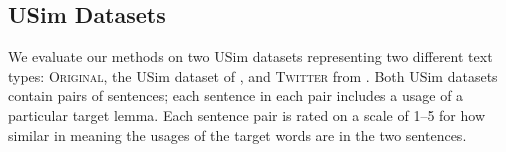 \documentclass[11pt]{article}
\newcommand\original{\textsc{Original}\xspace}
\newcommand\twitter{\textsc{Twitter}\xspace}
\begin{document}

\subsection{USim Datasets \label{sec:datasets}}


We evaluate our methods on two USim datasets representing two
different text types: \original, the USim dataset of ,
and \twitter from . Both USim datasets contain pairs
of sentences; each sentence in each pair includes a usage of a
particular target lemma. Each sentence pair is rated on a scale of
1--5 for how similar in meaning the usages of the target words are in
the two sentences.
\end{document}
